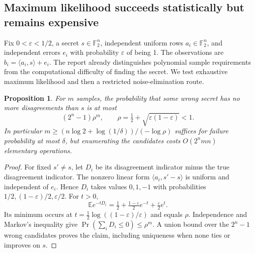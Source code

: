 \documentclass[11pt]{article}
\newtheorem{proposition}{Proposition}
\begin{document}
\subsection{Maximum likelihood succeeds statistically but remains expensive}
Fix $0<\varepsilon<1/2$, a secret $s\in\mathbb F_2^n$, independent uniform rows $a_i\in\mathbb F_2^n$, and independent errors $e_i$ with probability $\varepsilon$ of being 1. The observations are $b_i=\langle a_i,s\rangle+e_i$. The report already distinguishes polynomial sample requirements from the computational difficulty of finding the secret. We test exhaustive maximum likelihood and then a restricted noise-elimination route.
\begin{proposition}
For $m$ samples, the probability that some wrong secret has no more disagreements than $s$ is at most
\[
(2^n-1)\rho^m,\qquad \rho=\tfrac12+\sqrt{\varepsilon(1-\varepsilon)}<1.
\]
In particular $m\ge(n\log2+\log(1/\delta))/(-\log\rho)$ suffices for failure probability at most $\delta$, but enumerating the candidates costs $O(2^nmn)$ elementary operations.
\end{proposition}
\begin{proof}
For fixed $s'\ne s$, let $D_i$ be its disagreement indicator minus the true disagreement indicator. The nonzero linear form $\langle a_i,s'-s\rangle$ is uniform and independent of $e_i$. Hence $D_i$ takes values $0,1,-1$ with probabilities $1/2,(1-\varepsilon)/2,\varepsilon/2$. For $t>0$,
\[
\mathbb E e^{-tD_i}=\tfrac12+\tfrac{1-\varepsilon}{2}e^{-t}+\tfrac{\varepsilon}{2}e^t.
\]
Its minimum occurs at $t=\frac12\log((1-\varepsilon)/\varepsilon)$ and equals $\rho$. Independence and Markov's inequality give $\Pr(\sum_iD_i\le0)\le\rho^m$. A union bound over the $2^n-1$ wrong candidates proves the claim, including uniqueness when none ties or improves on $s$.
\end{proof}
\end{document}

